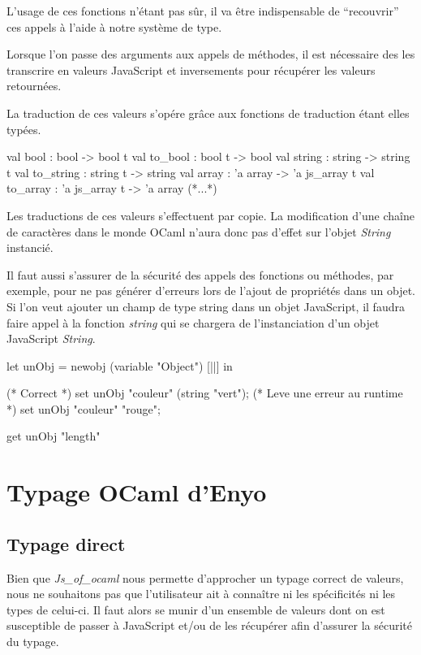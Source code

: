 \documentclass[11pt,a4paper]{report}
\begin{document}
L'usage de ces fonctions n'étant pas sûr, il va être indispensable de ``recouvrir'' ces appels
à l'aide à notre système de type.

Lorsque l'on passe des arguments aux appels de méthodes, il est nécessaire des les transcrire
en valeurs JavaScript et inversements pour récupérer les valeurs retournées.

La traduction de ces valeurs s'opére grâce aux fonctions de traduction étant elles typées.
\begin{OCaml}
  val bool : bool -> bool t
  val to_bool : bool t -> bool
  val string : string -> string t
  val to_string : string t -> string
  val array : 'a array -> 'a js_array t
  val to_array : 'a js_array t -> 'a array
  (*...*)
\end{OCaml}

Les traductions de ces valeurs s'effectuent par copie. La modification d'une chaîne de
caractères dans le monde OCaml n'aura donc pas d'effet sur l'objet \emph{String} instancié.

Il faut aussi s'assurer de la sécurité des appels des fonctions ou méthodes, par exemple,
pour ne pas générer d'erreurs lors de l'ajout de propriétés dans un objet. Si l'on veut ajouter 
un champ de type string dans un objet JavaScript, il faudra faire appel à la fonction 
\emph{string} qui se chargera de l'instanciation d'un objet JavaScript \emph{String}.

\begin{OCaml}
  let unObj = newobj (variable "Object") [||] in

  (* Correct *)
  set unObj "couleur" (string "vert");
  (* Leve une erreur au runtime *)
  set unObj "couleur" "rouge";

  get unObj "length"
\end{OCaml}

\section{Typage OCaml d'Enyo}
\subsection{Typage direct}

Bien que \emph{Js\_of\_ocaml} nous permette d'approcher un typage correct de valeurs, nous ne souhaitons pas
que l'utilisateur ait à connaître ni les spécificités ni les types de celui-ci.
Il faut alors se munir d'un ensemble de valeurs dont on est susceptible de passer à JavaScript
et/ou de les récupérer afin d'assurer la sécurité du typage.
\end{document}

